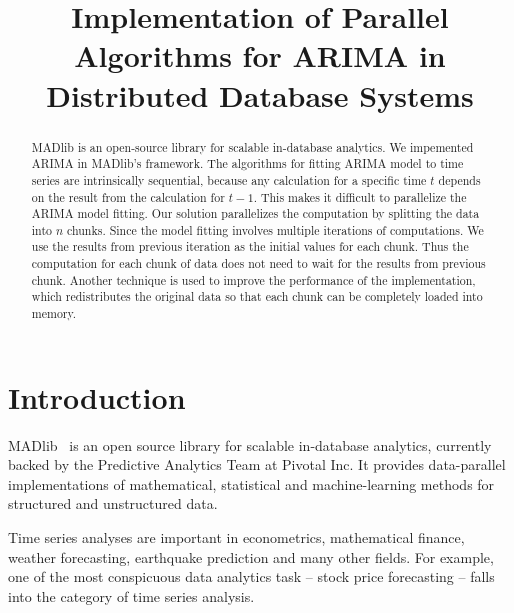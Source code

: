 \documentclass[english,12pt]{article}
\begin{document}
\title{Implementation of Parallel Algorithms for ARIMA in Distributed
  Database Systems}


\maketitle

\begin{abstract}
    MADlib is an open-source library for scalable in-database analytics. We
    impemented ARIMA in MADlib's framework. The algorithms for fitting ARIMA
    model to time series are intrinsically sequential, because any calculation
    for a specific time $t$ depends on the result from the calculation for
    $t-1$.  This makes it difficult to parallelize the ARIMA model fitting. Our
    solution parallelizes the computation by splitting the data into $n$
    chunks. Since the model fitting involves multiple iterations of
    computations. We use the results from previous iteration as the initial
    values for each chunk. Thus the computation for each chunk of data does not
    need to wait for the results from previous chunk. Another technique is used
    to improve the performance of the implementation, which redistributes the
    original data so that each chunk can be completely loaded into memory.
\end{abstract}


\section{Introduction}

MADlib~\cite{madlib} is an open source library for scalable
in-database analytics, currently backed by the Predictive Analytics
Team at Pivotal Inc. It provides data-parallel implementations of
mathematical, statistical and machine-learning methods for structured
and unstructured data.

Time series analyses are important in econometrics, mathematical
finance, weather forecasting, earthquake prediction and many other
fields. For example, one of the most conspicuous data analytics task
-- stock price forecasting -- falls into the category of time series
analysis.
\end{document}
